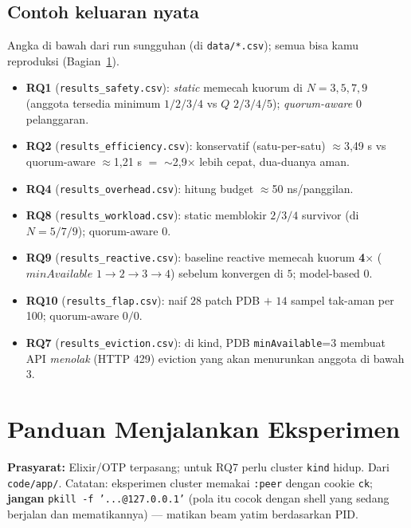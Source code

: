\documentclass[11pt]{article}
\newcommand{\code}[1]{\texttt{\small #1}}
\begin{document}
\subsection{Contoh keluaran nyata}
\label{sec:keluaran}
Angka di bawah dari run sungguhan (di \code{data/*.csv}); semua bisa kamu reproduksi (Bagian~\ref{sec:run}).
\begin{itemize}[leftmargin=1.4em]
  \item \textbf{RQ1} (\code{results\_safety.csv}): \emph{static} memecah kuorum di $N=3,5,7,9$ (anggota
        tersedia minimum $1/2/3/4$ vs $Q$ $2/3/4/5$); \emph{quorum-aware} $0$ pelanggaran.
  \item \textbf{RQ2} (\code{results\_efficiency.csv}): konservatif (satu-per-satu) $\approx$3{,}49 s vs
        quorum-aware $\approx$1{,}21 s $=$ $\sim$2{,}9$\times$ lebih cepat, dua-duanya aman.
  \item \textbf{RQ4} (\code{results\_overhead.csv}): hitung budget $\approx$50 ns/panggilan.
  \item \textbf{RQ8} (\code{results\_workload.csv}): static memblokir $2/3/4$ survivor (di $N=5/7/9$);
        quorum-aware $0$.
  \item \textbf{RQ9} (\code{results\_reactive.csv}): baseline reactive memecah kuorum \textbf{4$\times$}
        ($minAvailable$ $1\to2\to3\to4$) sebelum konvergen di $5$; model-based $0$.
  \item \textbf{RQ10} (\code{results\_flap.csv}): naif $28$ patch PDB $+$ $14$ sampel tak-aman per 100;
        quorum-aware $0/0$.
  \item \textbf{RQ7} (\code{results\_eviction.csv}): di kind, PDB \code{minAvailable}=3 membuat API
        \emph{menolak} (HTTP 429) eviction yang akan menurunkan anggota di bawah 3.
\end{itemize}

\section{Panduan Menjalankan Eksperimen}
\label{sec:run}
\textbf{Prasyarat:} Elixir/OTP terpasang; untuk RQ7 perlu cluster \code{kind} hidup. Dari
\code{code/app/}. Catatan: eksperimen cluster memakai \code{:peer} dengan cookie \code{ck};
\textbf{jangan} \code{pkill -f '...@127.0.0.1'} (pola itu cocok dengan shell yang sedang berjalan dan
mematikannya) --- matikan beam yatim berdasarkan PID.
\end{document}
